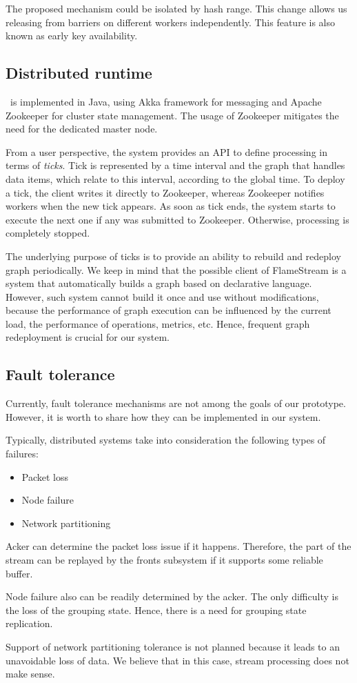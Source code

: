 The proposed mechanism could be isolated by hash range. This change allows us releasing from barriers on different workers independently. This feature is also known as early key availability.

\subsection{Distributed runtime}

\FlameStream\ is implemented in Java, using Akka framework for messaging and Apache Zookeeper for cluster state management. The usage of Zookeeper mitigates the need for the dedicated master node.

From a user perspective, the system provides an API to define processing in terms of {\it ticks}. Tick is represented by a time interval and the graph that handles data items, which relate to this interval, according to the global time. To deploy a tick, the client writes it directly to Zookeeper, whereas Zookeeper notifies workers when the new tick appears. As soon as tick ends, the system starts to execute the next one if any was submitted to Zookeeper. Otherwise, processing is completely stopped.

The underlying purpose of ticks is to provide an ability to rebuild and redeploy graph periodically. We keep in mind that the possible client of FlameStream is a system that automatically builds a graph based on declarative language. However, such system cannot build it once and use without modifications, because the performance of graph execution can be influenced by the current load, the performance of operations, metrics, etc. Hence, frequent graph redeployment is crucial for our system. 

\subsection{Fault tolerance}
Currently, fault tolerance mechanisms are not among the goals of our prototype. However, it is worth to share how they can be implemented in our system.

Typically, distributed systems take into consideration the following types of failures:
\begin{itemize}
    \item Packet loss
    \item Node failure
    \item Network partitioning
\end{itemize}

Acker can determine the packet loss issue if it happens. Therefore, the part of the stream can be replayed by the fronts subsystem if it supports some reliable buffer.

Node failure also can be readily determined by the acker. The only difficulty is the loss of the grouping state. Hence, there is a need for grouping state replication.

Support of network partitioning tolerance is not planned because it leads to an unavoidable loss of data. We believe that in this case, stream processing does not make sense.
